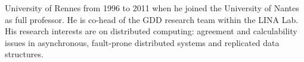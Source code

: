 University of Rennes from 1996 to 2011 when he joined the University of Nantes
as full professor. 
He is co-head of the GDD research team within the LINA Lab.  His research
interests are on distributed computing: agreement and
calculability issues in asynchronous, fault-prone distributed systems
and 
replicated data structures.

